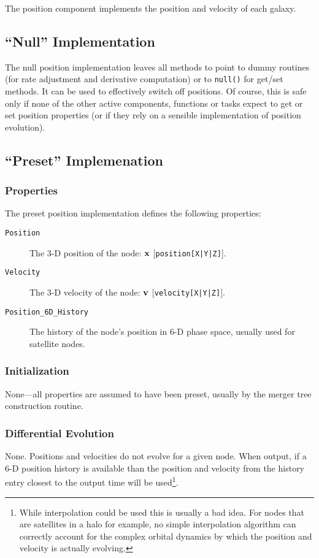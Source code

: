 The position component implements the position and velocity of each galaxy.

\subsection{``Null'' Implementation}

The null position implementation leaves all methods to point to dummy routines (for rate adjustment and derivative computation) or to {\tt null()} for get/set methods. It can be used to effectively switch off positions. Of course, this is safe only if none of the other active components, functions or tasks expect to get or set position properties (or if they rely on a sensible implementation of position evolution).

\subsection{``Preset'' Implemenation}

\subsubsection{Properties}

The preset position implementation defines the following properties:
\begin{description}
 \item [{\tt Position}] The 3-D position of the node: ${\bf x}$ [{\tt position[X|Y|Z]}].
 \item [{\tt Velocity}] The 3-D velocity of the node: ${\bf v}$ [{\tt velocity[X|Y|Z]}].
 \item [{\tt Position\_6D\_History}] The history of the node's position in 6-D phase space, usually used for satellite nodes.
\end{description}

\subsubsection{Initialization}

None---all properties are assumed to have been preset, usually by the merger tree construction routine.

\subsubsection{Differential Evolution}

None. Positions and velocities do not evolve for a given node. When output, if a 6-D position history is available than the position and velocity from the history entry closest to the output time will be used\footnote{While interpolation could be used this is usually a bad idea. For nodes that are satellites in a halo for example, no simple interpolation algorithm can correctly account for the complex orbital dynamics by which the position and velocity is actually evolving.}.

